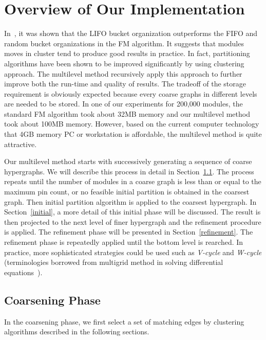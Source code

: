 \documentclass[journal]{IEEEtran}
\begin{document}
\section{Overview of Our Implementation}
\label{multilevel}
In~\cite{LIFO_1997}, it was shown that the LIFO bucket organization
outperforms the FIFO and random bucket organizations in the FM
algorithm. It suggests that modules moves in cluster tend to produce
good results in practice. In fact, partitioning algorithms have been
shown to be improved significantly by using clustering approach. 
The multilevel method recursively apply this approach to further 
improve both the run-time and quality of results. 
The tradeoff of the storage requirement is obviously expected 
because every coarse graphs in different levels are needed to be
stored. In one of our 
experiments for 200,000 modules, the standard FM algorithm took
about 32MB memory and our multilevel method took about 100MB
memory. However, 
based on the current computer technology that 4GB memory PC or
workstation is affordable, the multilevel method is quite attractive.

Our multilevel method starts with successively generating a sequence of
coarse hypergraphs. We will describe this process in detail in
Section~\ref{coarsening}. The process repeats
until the number of modules in a coarse graph is less than or equal
to the maximum pin count, or no feasible initial partition is
obtained in the coarsest graph. Then initial partition algorithm is
applied to the coarsest hypergraph. In Section~\ref{initial}, a more
detail of this initial phase will be discussed. The result is then
projected to the next level of finer hypergraph and the refinement
procedure is applied. The refinement phase will be presented in
Section~\ref{refinement}. The refinement phase is repeatedly applied
until the bottom level is rearched.
In practice, more sophisticated strategies could be used such as 
{\it V-cycle} and {\it W-cycle} (terminologies borrowed from multigrid
method in solving differential equations~\cite{multigrid_1992}).

\subsection{Coarsening Phase}
\label{coarsening}
In the coarsening phase, we first select a set of matching edges by
clustering algorithms described in the following sections.
\end{document}
